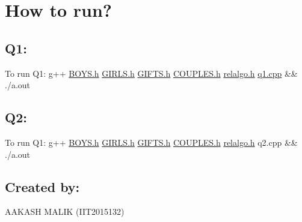 \hypertarget{index_intro_sec}{}\section{How to run?}\label{index_intro_sec}
\hypertarget{index_q1}{}\subsection{Q1\+:}\label{index_q1}
To run Q1\+: g++ \hyperlink{_b_o_y_s_8h}{B\+O\+Y\+S.\+h} \hyperlink{_g_i_r_l_s_8h}{G\+I\+R\+L\+S.\+h} \hyperlink{_g_i_f_t_s_8h}{G\+I\+F\+T\+S.\+h} \hyperlink{_c_o_u_p_l_e_s_8h}{C\+O\+U\+P\+L\+E\+S.\+h} \hyperlink{relalgo_8h}{relalgo.\+h} \hyperlink{q1_8cpp}{q1.\+cpp} \&\& ./a.out \hypertarget{index_q2}{}\subsection{Q2\+:}\label{index_q2}
To run Q1\+: g++ \hyperlink{_b_o_y_s_8h}{B\+O\+Y\+S.\+h} \hyperlink{_g_i_r_l_s_8h}{G\+I\+R\+L\+S.\+h} \hyperlink{_g_i_f_t_s_8h}{G\+I\+F\+T\+S.\+h} \hyperlink{_c_o_u_p_l_e_s_8h}{C\+O\+U\+P\+L\+E\+S.\+h} \hyperlink{relalgo_8h}{relalgo.\+h} q2.\+cpp \&\& ./a.out\hypertarget{index_creator}{}\subsection{Created by\+:}\label{index_creator}
A\+A\+K\+A\+SH M\+A\+L\+IK (I\+I\+T2015132) 